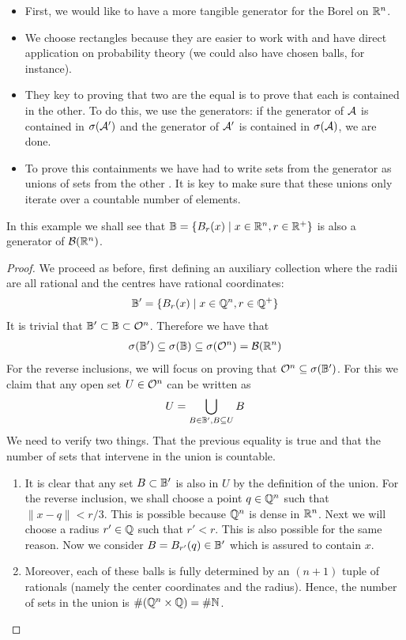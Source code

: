 \begin{itemize}
	\item First, we would like to have a more tangible generator for the Borel \siga on $\mathbb{R}^n$.
	\item We choose rectangles because they are easier to work with and have direct application on probability theory (we could also have chosen balls, for instance).
	\item They key to proving that two \sigas are the equal is to prove that each is contained in the other. To do this, we use the generators: if the generator of $\mathcal{A}$ is contained in $\sigma(\mathcal{A}')$ and the generator of $\mathcal{A}'$ is contained in $\sigma(\mathcal{A})$, we are done.
	\item To prove this containments we have had to write sets from the generator as unions of sets from the other \siga. It is key to make sure that these unions only iterate over a countable number of elements.
\end{itemize}

\begin{eg}
	In this example we shall see that $\mathbb{B} = \{B_r(x) \mid x \in \mathbb{R}^n, r \in \mathbb{R}^+\}$ is also a generator of $\mathcal{B}(\mathbb{R}^n)$.
\end{eg}

\begin{proof}
	We proceed as before, first defining an auxiliary collection where the radii are all rational and the centres have rational coordinates:
	\begin{align*}
	\mathbb{B}' = \{B_r(x) \mid x \in \mathbb{Q}^n, r \in \mathbb{Q}^+\}
	\end{align*}
	It is trivial that $\mathbb{B}' \subset \mathbb{B} \subset \mathcal{O}^n$. Therefore we have that
	\begin{align*}
	\sigma(\mathbb{B}') \subseteq \sigma(\mathbb{B}) \subseteq \sigma(\mathcal{O}^n) = \mathcal{B}(\mathbb{R}^n)
	\end{align*}
	For the reverse inclusions, we will focus on proving that $\mathcal{O}^n \subseteq \sigma(\mathbb{B}')$. For this we claim that any open set $U \in \mathcal{O}^n$ can be written as
	\begin{align*}
	U = \bigcup_{B \in \mathbb{B}', B \subseteq U} B
	\end{align*}
	We need to verify two things. That the previous equality is true and that the number of sets that intervene in the union is countable.
	\begin{enumerate}
		\item It is clear that any set $B\subset \mathbb{B}'$ is also in $U$ by the definition of the union. For the reverse inclusion, we shall choose a point $q \in \mathbb{Q}^n$ such that $\lVert x - q \rVert < r / 3$. This is possible because $\mathbb{Q}^n$ is dense in $\mathbb{R}^n$. Next we will choose a radius $r' \in \mathbb{Q}$ such that $r' < r$. This is also possible for the same reason. Now we consider $B = B_{r'}(q) \in \mathbb{B}'$ which is assured to contain $x$.
		
		\item Moreover, each of these balls is fully determined by an $(n+1)$ tuple of rationals (namely the center coordinates and the radius). Hence, the number of sets in the union is $\#(\mathbb{Q}^n \times \mathbb{Q}) = \# \mathbb{N}$.
	\end{enumerate}
\end{proof}